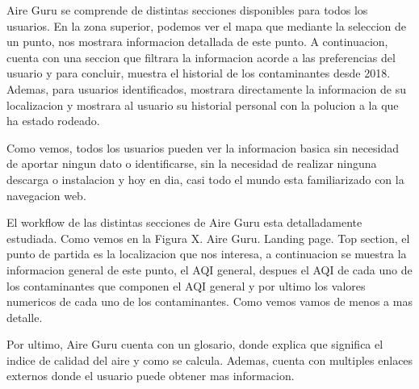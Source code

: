 Aire Guru se comprende de distintas secciones disponibles para todos los usuarios. En la zona superior, podemos ver el mapa que mediante la seleccion de un punto, nos
mostrara informacion detallada de este punto. A continuacion, cuenta con una seccion que filtrara la informacion acorde a las preferencias del usuario
y para concluir, muestra el historial de los contaminantes desde 2018.
Ademas, para usuarios identificados, mostrara directamente la informacion de su localizacion y mostrara al usuario su historial personal
con la polucion a la que ha estado rodeado.

Como vemos, todos los usuarios pueden ver la informacion basica sin necesidad de aportar ningun dato o identificarse, sin la necesidad de 
realizar ninguna descarga o instalacion y hoy en dia, casi todo el mundo esta familiarizado con la navegacion web.

El workflow de las distintas secciones de Aire Guru esta detalladamente estudiada. Como vemos en la Figura X. Aire Guru. Landing page. Top section, el punto de partida es la localizacion que nos interesa,
a continuacion se muestra la informacion general de este punto, el AQI general, despues el AQI de cada uno de los contaminantes que componen el 
AQI general y por ultimo los valores numericos de cada uno de los contaminantes. Como vemos vamos de menos a mas detalle.

Por ultimo, Aire Guru cuenta con un glosario, donde explica que significa el indice de calidad del aire y como se calcula. 
Ademas, cuenta con multiples enlaces externos donde el usuario puede obtener mas informacion.


